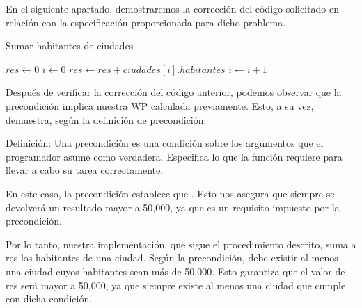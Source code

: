 \documentclass[10pt,a4paper]{article}
\begin{document}
En el siguiente apartado, demostraremos la corrección del código solicitado  en relación con la especificación proporcionada para dicho problema.  


\begin{algorithm}
\caption{Sumar habitantes de ciudades}
\begin{algorithmic}[1]
\State $res \gets 0$
\State $i \gets 0$
    \State $res \gets res + ciudades[i].habitantes$
    \State $i \gets i + 1$
\EndWhile
\end{algorithmic}
\end{algorithm}

Después de verificar la corrección del código anterior, podemos observar que la precondición implica nuestra WP calculada previamente. Esto, a su vez, demuestra, según la definición de precondición:

Definición: Una precondición es una condición sobre los argumentos que el programador asume como verdadera. Especifica lo que la función requiere para llevar a cabo su tarea correctamente.

En este caso, la precondición establece que . Esto nos asegura que siempre se devolverá un resultado mayor a 50,000, ya que es un requisito impuesto por la precondición.

Por lo tanto, nuestra implementación, que sigue el procedimiento descrito, suma a res los habitantes de una ciudad. Según la precondición, debe existir al menos una ciudad cuyos habitantes sean más de 50,000. Esto garantiza que el valor de res será mayor a 50,000, ya que siempre existe al menos una ciudad que cumple con dicha condición.
\end{document}

